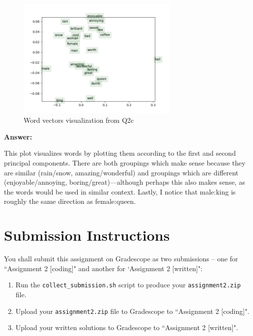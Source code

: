 \documentclass{article}
\newenvironment{answer}{
    {\bf Answer:} \sf \begingroup\color{red}
}{\endgroup}%
\begin{document}
\begin{enumerate}[label=(\alph*)]
\begin{figure}[h]
    \centering
    \includegraphics[width=0.7\textwidth]{word_vectors.png}
    \caption{Word vectors visualization from Q2c}
    \label{fig:word_vecs}
\end{figure}
    
\begin{shaded}
\begin{answer}
This plot visualizes words by plotting them according to the first and second principal components. There are both groupings which make sense because they are similar (rain/snow, amazing/wonderful) and groupings which are different (enjoyable/annoying, boring/great)---although perhaps this also makes sense, as the words would be used in similar context. Lastly, I notice that male:king is roughly the same direction as female:queen.
\end{answer}
\end{shaded}

\section{Submission Instructions}
You shall submit this assignment on Gradescope as two submissions -- one for ``Assignment 2 [coding]" and another for `Assignment 2 [written]":
\begin{enumerate}
    \item Run the \texttt{collect\_submission.sh} script to produce your \texttt{assignment2.zip} file.
    \item Upload your \texttt{assignment2.zip} file to Gradescope to ``Assignment 2 [coding]".
    \item Upload your written solutions to Gradescope to ``Assignment 2 [written]".
\end{enumerate}

\end{enumerate}
\end{document}

